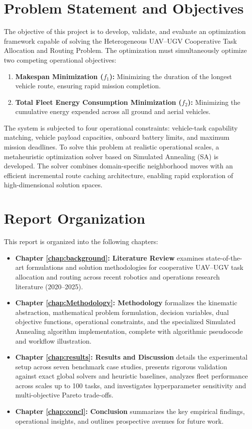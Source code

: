 \section{Problem Statement and Objectives} \label{sec:intro_objectives}
The objective of this project is to develop, validate, and evaluate an optimization framework capable of solving the Heterogeneous UAV--UGV Cooperative Task Allocation and Routing Problem. The optimization must simultaneously optimize two competing operational objectives:
\begin{enumerate}
    \item \textbf{Makespan Minimization ($f_1$):} Minimizing the duration of the longest vehicle route, ensuring rapid mission completion.
    \item \textbf{Total Fleet Energy Consumption Minimization ($f_2$):} Minimizing the cumulative energy expended across all ground and aerial vehicles.
\end{enumerate}

The system is subjected to four operational constraints: vehicle-task capability matching, vehicle payload capacities, onboard battery limits, and maximum mission deadlines. To solve this problem at realistic operational scales, a metaheuristic optimization solver based on Simulated Annealing (\ac{SA}) is developed. The solver combines domain-specific neighborhood moves with an efficient incremental route caching architecture, enabling rapid exploration of high-dimensional solution spaces.

\section{Report Organization} \label{sec:intro_org}
This report is organized into the following chapters:
\begin{itemize}
    \item \textbf{Chapter \ref{chap:background}: Literature Review} examines state-of-the-art formulations and solution methodologies for cooperative UAV--UGV task allocation and routing across recent robotics and operations research literature (2020--2025).
    \item \textbf{Chapter \ref{chap:Methodology}: Methodology} formalizes the kinematic abstraction, mathematical problem formulation, decision variables, dual objective functions, operational constraints, and the specialized Simulated Annealing algorithm implementation, complete with algorithmic pseudocode and workflow illustration.
    \item \textbf{Chapter \ref{chap:results}: Results and Discussion} details the experimental setup across seven benchmark case studies, presents rigorous validation against exact global solvers and heuristic baselines, analyzes fleet performance across scales up to 100 tasks, and investigates hyperparameter sensitivity and multi-objective Pareto trade-offs.
    \item \textbf{Chapter \ref{chap:concl}: Conclusion} summarizes the key empirical findings, operational insights, and outlines prospective avenues for future work.
\end{itemize}
